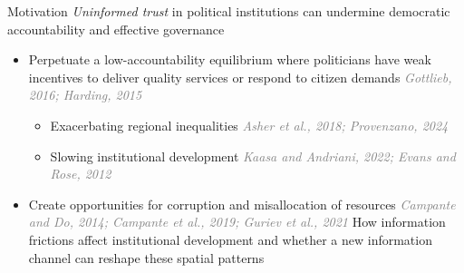 \documentclass[10pt]{beamer}
\begin{document}
\begin{frame}{Motivation}
\centering \textit{Uninformed trust} in political institutions can undermine democratic accountability and effective governance \vfill  \pause
\vspace{1em}
    \begin{itemize}\setlength\itemsep{1em}
        \item Perpetuate a low-accountability equilibrium where politicians have weak incentives to deliver quality services or respond to
        citizen demands \textcolor{gray}{\textit{Gottlieb, 2016; Harding, 2015}} \vfill
        \begin{itemize}\setlength\itemsep{0.5em}
            \item Exacerbating regional inequalities \textcolor{gray}{\textit{Asher et al., 2018; Provenzano, 2024}} \vfill
            \item Slowing institutional development \textcolor{gray}{\textit{Kaasa
            and Andriani, 2022; Evans and Rose, 2012}} \vfill   \pause
        \end{itemize}
        \item Create opportunities for corruption and misallocation of resources \textcolor{gray}{\textit{Campante and Do, 2014; Campante et al.,
        2019; Guriev et al., 2021}} \vfill  \pause
        \vspace{1em}
      \centering How information frictions
        affect institutional development and whether a new information channel can
        reshape these spatial patterns \vfill
    \end{itemize}
\end{frame}
\end{document}
